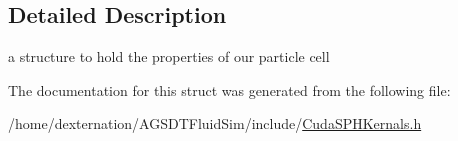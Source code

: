 \subsection{Detailed Description}
a structure to hold the properties of our particle cell 

The documentation for this struct was generated from the following file\-:\begin{DoxyCompactItemize}
\item 
/home/dexternation/\-A\-G\-S\-D\-T\-Fluid\-Sim/include/\hyperlink{_cuda_s_p_h_kernals_8h}{Cuda\-S\-P\-H\-Kernals.\-h}\end{DoxyCompactItemize}
